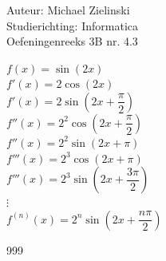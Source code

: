 \documentclass[a4paper]{article}
\begin{document}
\noindent \large Auteur: Michael Zielinski \\
\noindent \large Studierichting: Informatica\\
\noindent \large Oefeningenreeks 3B nr. 4.3\\

\medskip

\normalsize

$f(x) = \sin(2x)$\\

$f'(x) = 2\cos(2x)$\\

$f'(x) = 2\sin\left(2x+\dfrac{\pi}{2}\right)$\\

$f''(x) = 2^2\cos\left(2x+\dfrac{\pi}{2}\right)$\\

$f''(x) = 2^2\sin\left(2x+\pi\right)$\\

$f'''(x) = 2^3\cos\left(2x+\pi\right)$\\

$f'''(x) = 2^3\sin\left(2x+\dfrac{3\pi}{2}\right)$\\

$\vdots$\\

$f^{(n)}(x) = 2^n\sin\left(2x+\dfrac{n\pi}{2}\right)$\\

\begin{thebibliography}{999}
\end{thebibliography}
\end{document}
